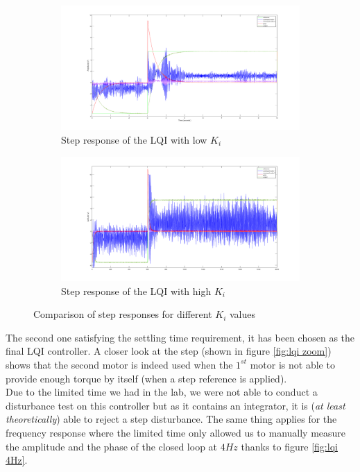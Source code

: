 \begin{figure}[H]
    \centering
    \begin{subfigure}[b]{0.5\textwidth}
        \centering
        \includegraphics[width=\textwidth]{Pictures/McGiver1.png}
        \caption{Step response of the LQI with low $K_i$}
    \end{subfigure}%
    \begin{subfigure}[b]{0.5\textwidth}
        \centering
        \includegraphics[width=\textwidth]{Pictures/McGiver2.png}
        \caption{Step response of the LQI with high $K_i$}
    \end{subfigure}
    \caption{Comparison of step responses for different $K_i$ values}
\end{figure}

The second one satisfying the settling time requirement, it has been chosen as the final LQI controller. A closer look
at the step (shown in figure \ref{fig:lqi zoom}) shows that the second motor is indeed used when the $1^{st}$ motor is
not able to provide enough torque by itself (when a step reference is applied).\\
Due to the limited time we had in the lab, we were not able to conduct a disturbance test on this controller but as it
contains an integrator, it is (\textit{at least theoretically}) able to reject a step disturbance. The same thing applies
for the frequency response where the limited time only allowed us to manually measure the amplitude and the phase of the
closed loop at $4 Hz$ thanks to figure \ref{fig:lqi 4Hz}.

